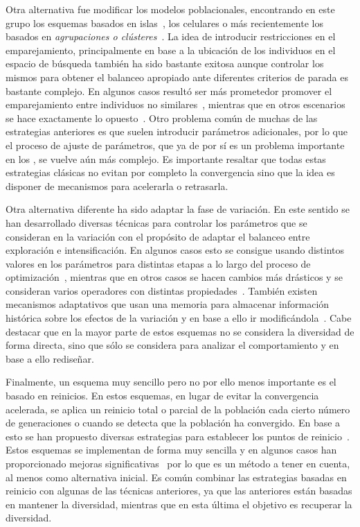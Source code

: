Otra alternativa fue modificar los modelos poblacionales, encontrando en este grupo los esquemas basados en islas~\cite{alba2005parallel}, los celulares
o más recientemente los basados en \textit{agrupaciones o clústeres}~\cite{gao2014cluster}.
%
La idea de introducir restricciones en el emparejamiento, principalmente en base a la ubicación de los individuos en el espacio de búsqueda también
ha sido bastante exitosa aunque controlar los mismos para obtener el balanceo apropiado ante diferentes criterios de parada
es bastante complejo.
%
En algunos casos resultó ser más prometedor promover el emparejamiento entre individuos no similares~\cite{Joel:CHC}, mientras que en otros escenarios 
se hace exactamente lo opuesto~\cite{deb1989investigation}.
%
Otro problema común de muchas de las estrategias anteriores es que suelen introducir parámetros adicionales, por lo que el proceso de ajuste de parámetros, que ya de por sí
es un problema importante en los \EAS{}, se vuelve aún más complejo.
%
Es importante resaltar que todas estas estrategias clásicas no evitan por completo la convergencia sino que la idea es disponer de mecanismos para acelerarla o retrasarla.

Otra alternativa diferente ha sido adaptar la fase de variación.
%
En este sentido se han desarrollado diversas técnicas para controlar los parámetros que se consideran en la variación con el propósito de 
adaptar el balanceo entre exploración e intensificación.
%
En algunos casos esto se consigue usando distintos valores en los parámetros para distintas etapas a lo largo del proceso de optimización~\cite{yu2014differential},
mientras que en otros casos se hacen cambios más drásticos y se consideran varios operadores con distintas propiedades~\cite{lobo2007parameter}.
%
También existen mecanismos adaptativos que usan una memoria para almacenar información histórica sobre los efectos de la variación
y en base a ello ir modificándola~\cite{yuen2009genetic}.
%
Cabe destacar que en la mayor parte de estos esquemas no se considera la diversidad de forma directa, sino que sólo se considera para analizar el comportamiento
y en base a ello rediseñar.

Finalmente, un esquema muy sencillo pero no por ello menos importante es el basado en reinicios.
%
En estos esquemas, en lugar de evitar la convergencia acelerada, se aplica un reinicio total o parcial de la población cada cierto número de
generaciones o cuando se detecta que la población ha convergido.
%
En base a esto se han propuesto diversas estrategias para establecer los puntos de reinicio~\cite{jansen2002analysis}.
%
Estos esquemas se implementan de forma muy sencilla y en algunos casos han proporcionado mejoras significativas~\cite{koumousis2006saw} por lo que
es un método a tener en cuenta, al menos como alternativa inicial.
%
Es común combinar las estrategias basadas en reinicio con algunas de las técnicas anteriores, ya que las anteriores están basadas en mantener
la diversidad, mientras que en esta última el objetivo es recuperar la diversidad.

